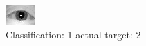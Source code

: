 \begin{figure}[h!]
\begin{center}
\includegraphics[width=0.60\columnwidth]{figures/ID937_class_1_target_2.png}
\end{center}
\caption{ Classification: 1 actual target: 2}
\label{fig:ID937_class_1_target_2}
\end{figure}
